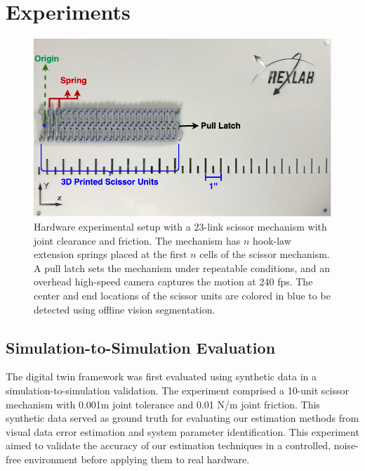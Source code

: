 \section{Experiments} \label{experiments}
\begin{figure}[ht]
    \centering
    \includegraphics[width=\linewidth]{Figures/scissor_hardware_setup.drawio.png}
    \caption{Hardware experimental setup with a 23-link scissor mechanism with joint clearance and friction. The mechanism has $n$ hook-law extension springs placed at the first $n$ cells of the scissor mechanism. A pull latch sets the mechanism under repeatable conditions, and an overhead high-speed camera captures the motion at 240 fps. The center and end locations of the scissor units are colored in blue to be detected using offline vision segmentation.}
    \label{fig:hardware_setup}
\end{figure}

\subsection{Simulation-to-Simulation Evaluation}

The digital twin framework was first evaluated using synthetic data in a simulation-to-simulation validation. The experiment comprised a 10-unit scissor mechanism with 0.001m joint tolerance and 0.01 N/m joint friction. This synthetic data served as ground truth for evaluating our estimation methods from visual data error estimation and system parameter identification. This experiment aimed to validate the accuracy of our estimation techniques in a controlled, noise-free environment before applying them to real hardware.

